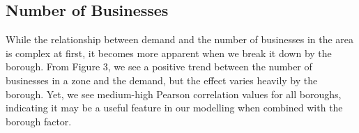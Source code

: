 \documentclass[11pt]{article}
\begin{document}
\subsection{Number of Businesses}
While the relationship between demand and the number of businesses in the area is complex at first, it becomes more apparent when we break it down by the borough. From Figure 3, we see a positive trend between the number of businesses in a zone and the demand, but the effect varies heavily by the borough. Yet, we see medium-high Pearson correlation values for all boroughs, indicating it may be a useful feature in our modelling when combined with the borough factor.

\begin{figure}[H]
\begin{floatrow}

\end{floatrow}
\end{figure}

\end{document}
